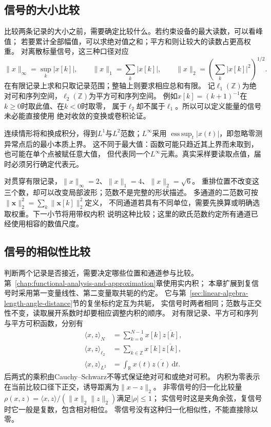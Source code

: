 \subsection{信号的大小比较}

比较两条记录的大小之前，需要确定比较什么。若约束设备的最大读数，可以看峰值；
若要累计全部幅值，可以求绝对值之和；平方和则让较大的读数占更高权重。
对离散标量信号，这三种口径对应
\[
  \|x\|_\infty=\sup_k|x[k]|,\qquad
  \|x\|_1=\sum_k|x[k]|,\qquad
  \|x\|_2=\left(\sum_k|x[k]|^2\right)^{1/2}.
\]
在有限记录上求和只取记录范围；整轴上则要求相应总和有限。
记$\ell_1(\mathbb Z)$为绝对可和序列空间，$\ell_2(\mathbb Z)$为平方可和序列空间。
例如$x[k]=(k+1)^{-1}$在$k\geq0$时取此值、在$k<0$时取零，
属于$\ell_2$却不属于$\ell_1$。所以可以定义能量的信号未必能直接使用
绝对收敛的变换或卷积论证。

连续情形将和换成积分，得到$L^1$与$L^2$范数；$L^\infty$采用
$\operatorname*{ess\,sup}_t|x(t)|$，即忽略零测异常点后的最小本质上界。
这不同于最大值：函数可能只趋近其上界而未取到，也可能在单个点被赋任意大值，
但代表同一个$L^\infty$元素。真实采样要读取点值，届时必须另行确定代表元。

对贯穿有限记录，$\|x\|_\infty=2$、$\|x\|_1=4$、$\|x\|_2=\sqrt6$。
重排位置不改变这三个数，却可以改变局部波形；范数不是完整的形状描述。
多通道的二范数可按
$\|\bm x\|_2^2=\sum_k\|\bm x[k]\|_2^2$定义，
不同通道若具有不同单位，需要先换算或明确选取权重。下一小节将用带权内积
说明这种比较；这里的欧氏范数约定所有通道已经使用相容的数值尺度。

\subsection{信号的相似性比较}

判断两个记录是否接近，需要决定哪些位置和通道参与比较。
第~\ref{chap:functional-analysis-and-approximation}章使用实内积；
本章扩展到复信号时采用第一变量线性、第二变量取共轭的约定。
它与第~\ref{sec:linear-algebra-length-angle-distance}节的复坐标约定互为共轭，
实信号时两者相同；范数与正交性不变，读取展开系数时却要相应调整内积的顺序。
对有限记录、平方可和序列与平方可积函数，分别有
\begin{equation}
  \begin{aligned}
    \langle x,z\rangle_N&=\sum_{k=0}^{N-1}x[k]\overline{z[k]},\\
    \langle x,z\rangle_{\ell_2}&=\sum_{k\in\mathbb Z}x[k]\overline{z[k]},\\
    \langle x,z\rangle_{L^2}&=\int_{\mathbb R}x(t)\overline{z(t)}\,\mathrm dt.
  \end{aligned}
  \label{eq:signal-inner-products}
\end{equation}
后两式的乘积由Cauchy--Schwarz不等式保证绝对可和或绝对可积。
内积为零表示在当前比较口径下正交，诱导距离为$\|x-z\|_2$。
非零信号的归一化比较量
$\rho(x,z)=\langle x,z\rangle/(\|x\|_2\|z\|_2)$满足$|\rho|\leq1$；
实信号时这是夹角余弦，复信号时它一般是复数，包含相对相位。
零信号没有这种归一化相似性，不能直接除以零。

